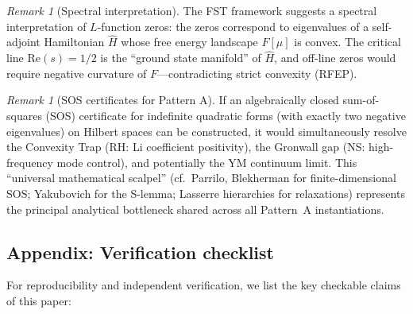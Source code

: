 \documentclass[12pt,a4paper]{article}
\theoremstyle{definition}
\theoremstyle{remark}
\newtheorem{remark}[theorem]{Remark}
\begin{document}
\begin{remark}[Spectral interpretation]
\label{rem:spectral-interpretation}
The FST framework suggests a spectral interpretation of $L$-function zeros: the zeros correspond to eigenvalues of a self-adjoint Hamiltonian $\hat{H}$ whose free energy landscape $F[\mu]$ is convex. The critical line $\mathrm{Re}(s) = 1/2$ is the ``ground state manifold'' of $\hat{H}$, and off-line zeros would require negative curvature of $F$---contradicting strict convexity (RFEP).
\end{remark}

\begin{remark}[SOS certificates for Pattern A]
\label{rem:sos-certificate}
If an algebraically closed sum-of-squares (SOS) certificate for indefinite quadratic forms (with exactly two negative eigenvalues) on Hilbert spaces can be constructed, it would simultaneously resolve the Convexity Trap (RH: Li coefficient positivity), the Gronwall gap (NS: high-frequency mode control), and potentially the YM continuum limit. This ``universal mathematical scalpel'' (cf.~Parrilo, Blekherman for finite-dimensional SOS; Yakubovich for the S-lemma; Lasserre hierarchies for relaxations) represents the principal analytical bottleneck shared across all Pattern~A instantiations.
\end{remark}

\subsection*{Appendix: Verification checklist}
\label{app:verification}

For reproducibility and independent verification, we list the key checkable claims of this paper:
\end{document}
